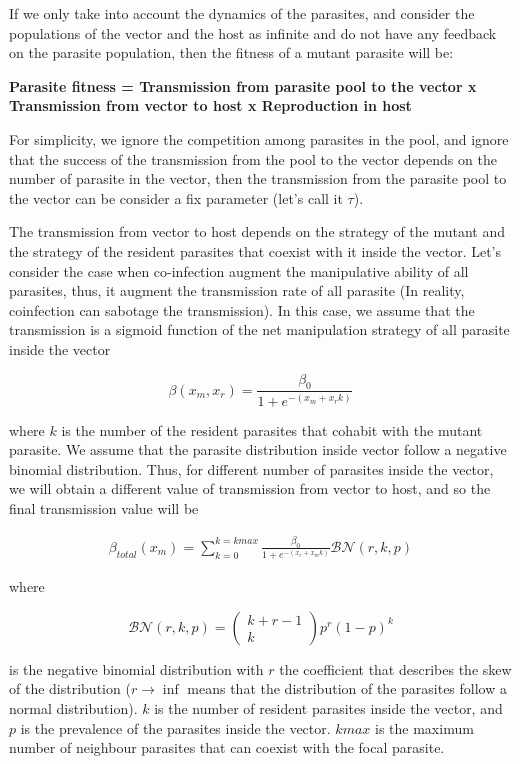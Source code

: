 \documentclass{article}
\begin{document}
If we only take into account the dynamics of the parasites, and consider the populations of the vector and the host as infinite and do not have any feedback on the parasite population, then the fitness of a mutant parasite will be:

\textbf{Parasite fitness = Transmission from parasite pool to the vector x Transmission from vector to host x Reproduction in host}

For simplicity, we ignore the competition among parasites in the pool, and ignore that the success of the transmission from the pool to the vector depends on the number of parasite in the vector, then the transmission from the parasite pool to the vector can be consider a fix parameter (let's call it $\tau$).

The transmission from vector to host depends on the strategy of the mutant and the strategy of the resident parasites that coexist with it inside the vector. Let's consider the case when co-infection augment the manipulative ability of all parasites, thus, it augment the transmission rate of all parasite (In reality, coinfection can sabotage the transmission). In this case, we assume that the transmission is a sigmoid function of the net manipulation strategy of all parasite inside the vector

$$\beta(x_m, x_r) = \frac{\beta_0}{1 + e^{-(x_m + x_r k)}}$$

where $k$ is the number of the resident parasites that cohabit with the mutant parasite. We assume that the parasite distribution inside vector follow a negative binomial distribution. Thus, for different number of parasites inside the vector, we will obtain a different value of transmission from vector to host, and so the final transmission value will be

\begin{align*}
    \beta_{total}(x_m) = \sum_{k = 0}^{k = kmax} \frac{\beta_0}{1 + e^{-(x_r + x_m  k)}} \mathcal{BN}(r, k, p)
\end{align*}

where 

$$\mathcal{BN}(r, k, p)
= \begin{pmatrix} k + r - 1 \\ k\end{pmatrix}p^r (1 -p)^k$$

is the negative binomial distribution with $r$ the coefficient that describes the skew of the distribution ($r \rightarrow \inf$ means that the distribution of the parasites follow a normal distribution). $k$ is the number of resident parasites inside the vector, and $p$ is the prevalence of the parasites inside the vector. $kmax$ is the maximum number of neighbour parasites that can coexist with the focal parasite.
\end{document}
